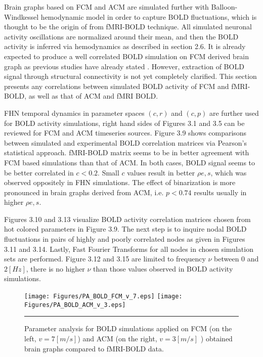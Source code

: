 Brain graphs based on FCM and ACM are simulated further with Balloon-Windkessel hemodynamic model in order to capture BOLD fluctuations, which is thought to be the origin of from fMRI-BOLD technique. All simulated neuronal activity oscillations are normalized around their mean, and then the BOLD activity is inferred via hemodynamics as described in section 2.6. It is already expected to produce a well correlated BOLD simulation on FCM derived brain graph as previous studies have already stated \citep{VUK13}. However, extraction of BOLD signal through structural connectivity is not yet completely clarified. This section presents any correlations between simulated BOLD activity of FCM and fMRI-BOLD, as well as that of ACM and fMRI BOLD. 

FHN temporal dynamics in parameter spaces $(c,r)$ and $(c,p)$ are further used for BOLD activity simulations, right hand sides of Figures 3.1 and 3.5 can be reviewed for FCM and ACM timeseries sources. Figure 3.9 shows comparisons between simulated and experimental BOLD correlation matrices via Pearson's statistical approach. fMRI-BOLD matrix seems to be in better agreement with FCM based simulations than that of ACM. In both cases, BOLD signal seems to  be better correlated in $c<0.2$. Small $c$ values result in better $\rho{e,s}$, which was observed oppositely in FHN simulations. The effect of binarization is more pronounced in brain graphs derived from ACM, i.e. $p<0.74$ results usually in higher $\rho{e,s}$.

Figures 3.10 and 3.13 visualize BOLD activity correlation matrices chosen from hot colored parameters in Figure 3.9. The next step is to inquire nodal BOLD fluctuations in pairs of highly and poorly correlated nodes as given in Figures 3.11 and 3.14. Lastly, Fast Fourier Transforms for all nodes in chosen simulation sets are performed. Figure 3.12 and 3.15 are limited to frequency $\nu$ between $0$ and $2[Hz]$, there is no higher $\nu$ than those values observed in BOLD activity simulations.




\begin{figure}[htbp]
 
  \centering
    \texttt{[image: Figures/PA\_BOLD\_FCM\_v\_7.eps]} 
	\texttt{[image: Figures/PA\_BOLD\_ACM\_v\_3.eps]} 

	
    \rule{35em}{0.5pt}
  \caption[Parameter Analysis, BOLD]{Parameter analysis for BOLD simulations applied on FCM (on the left, $v=7 [m/s]$) and ACM (on the right, $v=3 [m/s]$ ) obtained brain graphs compared to fMRI-BOLD data. }
  \label{fig:Parameter Analysis, BOLD}
 	
\end{figure} 



